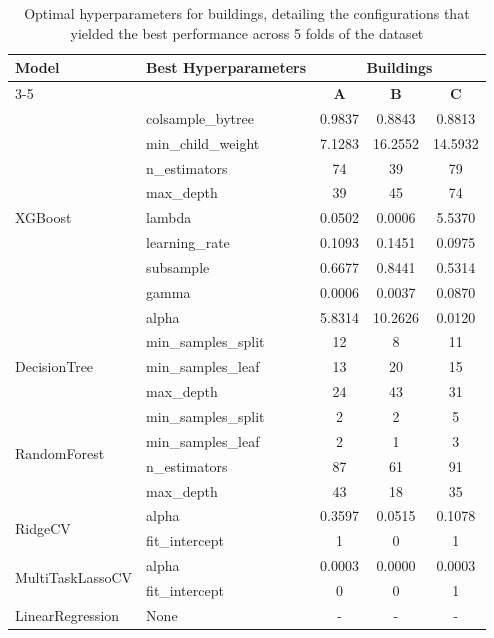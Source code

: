 
\begin{table}[h!]
    \centering
    \caption{Optimal hyperparameters for buildings, detailing the configurations that yielded the best performance across 5 folds of the dataset}
    \label{tab:best_params}
    \begin{tabular}{llccc}
    \hline
    \textbf{Model} & \textbf{Best Hyperparameters} & \multicolumn{3}{c}{\textbf{Buildings}} \\ \cline{3-5} 
    & & \textbf{A} & \textbf{B} & \textbf{C} \\ \hline
\multirow{9}{*}{XGBoost} & colsample\_bytree & 0.9837 & 0.8843 & 0.8813 \\
& min\_child\_weight & 7.1283 & 16.2552 & 14.5932 \\
& n\_estimators & 74 & 39 & 79 \\
& max\_depth & 39 & 45 & 74 \\
& lambda & 0.0502 & 0.0006 & 5.5370 \\
& learning\_rate & 0.1093 & 0.1451 & 0.0975 \\
& subsample & 0.6677 & 0.8441 & 0.5314 \\
& gamma & 0.0006 & 0.0037 & 0.0870 \\
& alpha & 5.8314 & 10.2626 & 0.0120 \\
\hline
\multirow{3}{*}{DecisionTree} & min\_samples\_split & 12 & 8 & 11 \\
& min\_samples\_leaf & 13 & 20 & 15 \\
& max\_depth & 24 & 43 & 31 \\
\hline
\multirow{4}{*}{RandomForest} & min\_samples\_split & 2 & 2 & 5 \\
& min\_samples\_leaf & 2 & 1 & 3 \\
& n\_estimators & 87 & 61 & 91 \\
& max\_depth & 43 & 18 & 35 \\
\hline
\multirow{2}{*}{RidgeCV} & alpha & 0.3597 & 0.0515 & 0.1078 \\
& fit\_intercept & 1 & 0 & 1 \\
\hline
\multirow{2}{*}{MultiTaskLassoCV} & alpha & 0.0003 & 0.0000 & 0.0003 \\
& fit\_intercept & 0 & 0 & 1 \\
\hline
LinearRegression & None & - & - & - \\
\hline

    \end{tabular}
\end{table}
